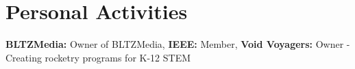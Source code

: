 
\section{Personal Activities}

\textbf{BLTZMedia:} Owner of BLTZMedia, \textbf{IEEE:} Member, \textbf{Void Voyagers:} Owner - Creating rocketry programs for K-12 STEM
\begin{comment}
\denseouterlist{

\entrymid[\textbullet] {BLTZ Media}{2021\textendash Present}
{Owner and photographer for BLTZ Media.}


\entrymid[\textbullet]{IEEE}{2022\textendash Present}{Member of NMT's IEEE chapter, participating weekly in meetings and exercises.}

\entrymid[\textbullet]{Void Voyagers Aerospace}{2023\textendash Present}{Founder: Building rocketry programs and competitions for youth involvement in STEM.}


}
\end{comment}